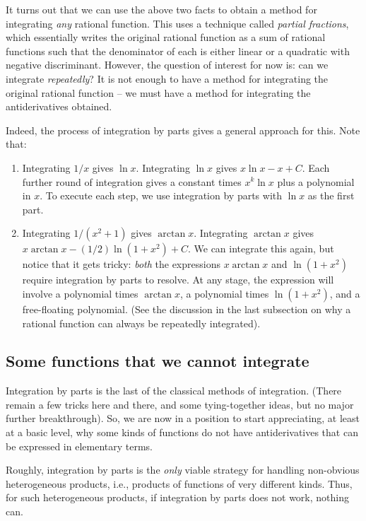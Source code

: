 \documentclass{amsart}
\begin{document}
It turns out that we can use the above two facts to obtain a method
for integrating {\em any} rational function. This uses a technique
called {\em partial fractions}, which essentially writes the original
rational function as a sum of rational functions such that the
denominator of each is either linear or a quadratic with negative
discriminant. However, the question of interest for now is: can we
integrate {\em repeatedly}? It is not enough to have a method for
integrating the original rational function -- we must have a method
for integrating the antiderivatives obtained.

Indeed, the process of integration by parts gives a general approach
for this. Note that:

\begin{enumerate}
\item Integrating $1/x$ gives $\ln x$. Integrating $\ln x$ gives
  $x\ln x - x + C$. Each further round of integration gives a constant
  times $x^k\ln x$ plus a polynomial in $x$. To execute each step, we
  use integration by parts with $\ln x$ as the first part.
\item Integrating $1/(x^2 + 1)$ gives $\arctan x$. Integrating
  $\arctan x$ gives $x\arctan x - (1/2) \ln(1 + x^2) + C$. We can
  integrate this again, but notice that it gets tricky: {\em both} the
  expressions $x \arctan x$ and $\ln(1 + x^2)$ require integration by
  parts to resolve. At any stage, the expression will involve a
  polynomial times $\arctan x$, a polynomial times $\ln(1 + x^2)$, and
  a free-floating polynomial. (See the discussion in the last
  subsection on why a rational function can always be repeatedly
  integrated).
\end{enumerate}

\subsection{Some functions that we cannot integrate}

Integration by parts is the last of the classical methods of
integration. (There remain a few tricks here and there, and some
tying-together ideas, but no major further breakthrough). So, we are
now in a position to start appreciating, at least at a basic level,
why some kinds of functions do not have antiderivatives that can be
expressed in elementary terms.

Roughly, integration by parts is the {\em only} viable strategy for
handling non-obvious heterogeneous products, i.e., products of
functions of very different kinds. Thus, for such heterogeneous
products, if integration by parts does not work, nothing can.
\end{document}
